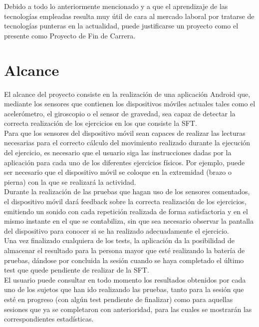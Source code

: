 Debido a todo lo anteriormente mencionado y a que el aprendizaje de las tecnologías empleadas resulta muy útil de cara al mercado laboral por tratarse de tecnologías punteras en la actualidad, puede justificarse un proyecto como el presente como Proyecto de Fin de Carrera.

\section{Alcance}

El alcance del proyecto consiste en la realización de una aplicación Android que, mediante los sensores que contienen los dispositivos móviles actuales tales como el acelerómetro, el giroscopio o el sensor de gravedad, sea capaz de detectar la correcta realización de los ejercicios en los que consiste la SFT.\\

Para que los sensores del dispositivo móvil sean capaces de realizar las lecturas necesarias para el correcto cálculo del movimiento realizado durante la ejecución del ejercicio, es necesario que el usuario siga las instrucciones dadas por la aplicación para cada uno de los diferentes ejercicios físicos. Por ejemplo, puede ser necesario que el dispositivo móvil se coloque en la extremidad (brazo o pierna) con la que se realizará la actividad.\\

Durante la realización de las pruebas que hagan uso de los sensores comentados, el dispositivo móvil dará feedback sobre la correcta realización de los ejercicios, emitiendo un sonido con cada repetición realizada de forma satisfactoria y en el mismo instante en el que se contabiliza, sin que sea necesario observar la pantalla del dispositivo para conocer si se ha realizado adecuadamente el ejercicio.\\

Una vez finalizado cualquiera de los tests, la aplicación da la posibilidad de almacenar el resultado para la persona mayor que esté realizando la batería de pruebas, dándose por concluida la sesión cuando se haya completado el último test que quede pendiente de realizar de la SFT.\\

El usuario puede consultar en todo momento los resultados obtenidos por cada uno de los sujetos que han ido realizando las pruebas, tanto para la sesión que esté en progreso (con algún test pendiente de finalizar) como para aquellas sesiones que ya se completaron con anterioridad, para las cuales se mostrarán las correspondientes estadísticas.\\


